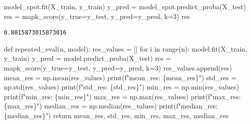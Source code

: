 \documentclass[
  letterpaper,
  DIV=11,
  numbers=noendperiod]{scrreprt}
\newenvironment{Shaded}{\begin{snugshade}}{\end{snugshade}}
\newcommand{\BuiltInTok}[1]{\textcolor[rgb]{0.00,0.23,0.31}{#1}}
\newcommand{\ControlFlowTok}[1]{\textcolor[rgb]{0.00,0.23,0.31}{#1}}
\newcommand{\DecValTok}[1]{\textcolor[rgb]{0.68,0.00,0.00}{#1}}
\newcommand{\KeywordTok}[1]{\textcolor[rgb]{0.00,0.23,0.31}{#1}}
\newcommand{\NormalTok}[1]{\textcolor[rgb]{0.00,0.23,0.31}{#1}}
\newcommand{\OperatorTok}[1]{\textcolor[rgb]{0.37,0.37,0.37}{#1}}
\newcommand{\SpecialCharTok}[1]{\textcolor[rgb]{0.37,0.37,0.37}{#1}}
\newcommand{\SpecialStringTok}[1]{\textcolor[rgb]{0.13,0.47,0.30}{#1}}
\begin{document}
\begin{Shaded}
\begin{Highlighting}[]
\NormalTok{model\_spot.fit(X\_train, y\_train)}
\NormalTok{y\_pred }\OperatorTok{=}\NormalTok{ model\_spot.predict\_proba(X\_test)}
\NormalTok{res }\OperatorTok{=}\NormalTok{ mapk\_score(y\_true}\OperatorTok{=}\NormalTok{y\_test, y\_pred}\OperatorTok{=}\NormalTok{y\_pred, k}\OperatorTok{=}\DecValTok{3}\NormalTok{)}
\NormalTok{res}
\end{Highlighting}
\end{Shaded}

\begin{verbatim}
0.8015873015873016
\end{verbatim}

\begin{Shaded}
\begin{Highlighting}[]
\KeywordTok{def}\NormalTok{ repeated\_eval(n, model):}
\NormalTok{    res\_values }\OperatorTok{=}\NormalTok{ []}
    \ControlFlowTok{for}\NormalTok{ i }\KeywordTok{in} \BuiltInTok{range}\NormalTok{(n):}
\NormalTok{        model.fit(X\_train, y\_train)}
\NormalTok{        y\_pred }\OperatorTok{=}\NormalTok{ model.predict\_proba(X\_test)}
\NormalTok{        res }\OperatorTok{=}\NormalTok{ mapk\_score(y\_true}\OperatorTok{=}\NormalTok{y\_test, y\_pred}\OperatorTok{=}\NormalTok{y\_pred, k}\OperatorTok{=}\DecValTok{3}\NormalTok{)}
\NormalTok{        res\_values.append(res)}
\NormalTok{    mean\_res }\OperatorTok{=}\NormalTok{ np.mean(res\_values)}
    \BuiltInTok{print}\NormalTok{(}\SpecialStringTok{f"mean\_res: }\SpecialCharTok{\{}\NormalTok{mean\_res}\SpecialCharTok{\}}\SpecialStringTok{"}\NormalTok{)}
\NormalTok{    std\_res }\OperatorTok{=}\NormalTok{ np.std(res\_values)}
    \BuiltInTok{print}\NormalTok{(}\SpecialStringTok{f"std\_res: }\SpecialCharTok{\{}\NormalTok{std\_res}\SpecialCharTok{\}}\SpecialStringTok{"}\NormalTok{)}
\NormalTok{    min\_res }\OperatorTok{=}\NormalTok{ np.}\BuiltInTok{min}\NormalTok{(res\_values)}
    \BuiltInTok{print}\NormalTok{(}\SpecialStringTok{f"min\_res: }\SpecialCharTok{\{}\NormalTok{min\_res}\SpecialCharTok{\}}\SpecialStringTok{"}\NormalTok{)}
\NormalTok{    max\_res }\OperatorTok{=}\NormalTok{ np.}\BuiltInTok{max}\NormalTok{(res\_values)}
    \BuiltInTok{print}\NormalTok{(}\SpecialStringTok{f"max\_res: }\SpecialCharTok{\{}\NormalTok{max\_res}\SpecialCharTok{\}}\SpecialStringTok{"}\NormalTok{)}
\NormalTok{    median\_res }\OperatorTok{=}\NormalTok{ np.median(res\_values)}
    \BuiltInTok{print}\NormalTok{(}\SpecialStringTok{f"median\_res: }\SpecialCharTok{\{}\NormalTok{median\_res}\SpecialCharTok{\}}\SpecialStringTok{"}\NormalTok{)}
    \ControlFlowTok{return}\NormalTok{ mean\_res, std\_res, min\_res, max\_res, median\_res}
\end{Highlighting}
\end{Shaded}
\end{document}
